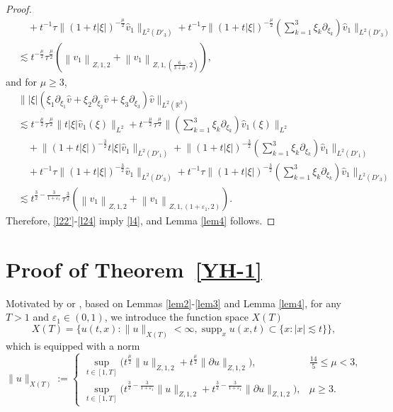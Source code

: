 \documentclass[11pt,twoside]{article}
\newcommand{\R}{\mathbb R}
\newcommand{\p}{\partial}
\newcommand{\f}{\frac}
\theoremstyle{plain}
\theoremstyle{definition}
\theoremstyle{remark}
\numberwithin{equation}{section}
\begin{document}
\begin{proof}
\begin{equation}
\begin{aligned}
&\quad+ t^{-1}\tau\big\|(1+t|\xi|)^{-\frac{\mu}{2}}\hat{v}_{1}\big\|_{L^{2}(D'_3)}+t^{-1}\tau \big\|(1+t|\xi|)^{-\frac{\mu}{2}}(\sum_{k=1}^3\xi_k\p_{\xi_k})\hat{v}_{1}\big\|_{L^{2}(D'_3)}\\
&\lesssim t^{-\f{\mu}{2}}\tau^{\f{\mu}{2}}(\left\|v_1\right\|_{Z, 1,2}+\left\|v_1\right\|_{Z, 1,(\f{6}{3+\mu}, 2)}),
\end{aligned}
\end{equation}
and for $\mu\geq3$,
\begin{equation}\label{l24}
\begin{aligned}
&\big\||\xi|(\xi_1\p_{\xi_1}\hat{v}+\xi_2\p_{\xi_2}\hat{v}+\xi_3\p_{\xi_3})\hat{v}\big\|_{L^2(\R^3)}
\\
& \lesssim t^{-\frac{\mu}{2}}\tau^{\frac{\mu}{2}}\big\| t|\xi|  \hat{v}_1(\xi)\big\|_{L^2}+t^{-\frac{\mu}{2}}\tau^{\frac{\mu}{2}}\big\| (\sum_{k=1}^3\xi_k\p_{\xi_k})  \hat{v}_1(\xi)\big\|_{L^2}\\
&\quad+ \big\|(1+t|\xi|)^{-\frac{3}{2}}t|\xi|\hat{v}_{1}\big\|_{L^{2}(D'_1)}+ \big\|(1+t|\xi|)^{-\frac{3}{2}}(\sum_{k=1}^3\xi_k\p_{\xi_k})\hat{v}_{1}\big\|_{L^{2}(D'_1)}\\
&\quad+ t^{-1}\tau\big\|(1+t|\xi|)^{-\frac{3}{2}}\hat{v}_{1}\big\|_{L^{2}(D'_3)}+t^{-1}\tau \big\|(1+t|\xi|)^{-\frac{3}{2}}(\sum_{k=1}^3\xi_k\p_{\xi_k})\hat{v}_{1}\big\|_{L^{2}(D'_3)}\\
&\lesssim t^{\f32-\frac{3}{1+\varepsilon_1}} \tau^{\f32}(\left\|v_1\right\|_{Z, 1, 2}+\left\|v_1\right\|_{Z, 1, \left(1+\varepsilon_1, 2\right)}).
\end{aligned}
\end{equation}
Therefore,  \eqref{l22'}-\eqref{l24} imply \eqref{l4}, and Lemma \ref{lem4} follows.
\end{proof}

\section{Proof of Theorem~\ref{YH-1}}
Motivated by \cite{LX} or \cite[Section 5]{LY}, based on Lemmas \ref{lem2}-\ref{lem3} and Lemma \ref{lem4},
for any $T>1$ and $\varepsilon_1\in(0, 1)$, we introduce the function space $X(T)$
$$
X(T)=\{u(t,x): \|u\|_{X(T)}<\infty, \operatorname{supp}_x u(x, t)\subset\{x: |x|\lesssim t\}\},
$$
which is equipped with a norm
\begin{equation}\label{Q1}
\|u\|_{X(T)}:=\begin{cases}
\sup _{t \in[1, T]}\big(t^{\f{\mu}{2}}\|u\|_{Z, 1, 2}+t^{\f{\mu}{2}}\|\p u\|_{Z, 1, 2}\big),&\f{14}{5}\leq\mu<3,\\
\sup _{t \in[1, T]}\big(t^{\f32-\f{3}{1+\varepsilon_1}}\|u\|_{Z, 1, 2}+t^{\f32-\f{3}{1+\varepsilon_1}}\|\p u\|_{Z, 1, 2}\big),&\mu\geq3.
\end{cases}
\end{equation}
\end{document}
